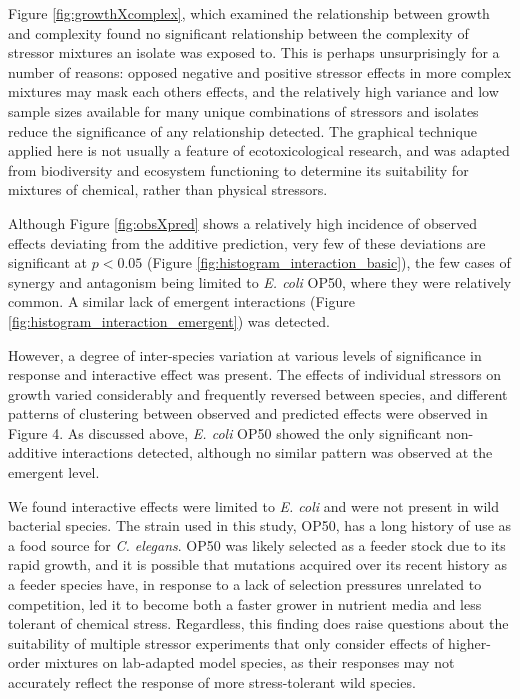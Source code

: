 \documentclass[10pt]{article}
\begin{document}
Figure \ref{fig:growthXcomplex}, which examined the relationship between growth and complexity found no significant relationship between the complexity of stressor mixtures an isolate was exposed to. This is perhaps unsurprisingly for a number of reasons: opposed negative and positive stressor effects in more complex mixtures may mask each others effects, and the relatively high variance and low sample sizes available for many unique combinations of stressors and isolates reduce the significance of any relationship detected. The graphical technique applied here is not usually a feature of ecotoxicological research, and was adapted from biodiversity and ecosystem functioning to determine its suitability for mixtures of chemical, rather than physical stressors.

Although Figure \ref{fig:obsXpred} shows a relatively high incidence of observed effects deviating from the additive prediction, very few of these deviations are significant at $p < 0.05$ (Figure \ref{fig:histogram_interaction_basic}), the few cases of synergy and antagonism being limited to \textit{E. coli} OP50, where they were relatively common. A similar lack of emergent interactions (Figure \ref{fig:histogram_interaction_emergent}) was detected. 

However, a degree of inter-species variation at various levels of significance in response and interactive effect was present. The effects of individual stressors on growth varied considerably and frequently reversed between species, and different patterns of clustering between observed and predicted effects were observed in Figure 4. As discussed above, \textit{E. coli} OP50 showed the only significant non-additive interactions detected, although no similar pattern was observed at the emergent level. 

We found interactive effects were limited to \textit{E. coli} and were not present in wild bacterial species. The strain used in this study, OP50, has a long history of use as a food source for \textit{C. elegans}. OP50 was likely selected as a feeder stock due to its rapid growth, and it is possible that mutations acquired over its recent history as a feeder species \cite{Tenaillon2016} have, in response to a lack of selection pressures unrelated to competition, led it to become both a faster grower in nutrient media and less tolerant of chemical stress. Regardless, this finding does raise questions about the suitability of multiple stressor experiments that only consider effects of higher-order mixtures on lab-adapted model species, as their responses may not accurately reflect the response of more stress-tolerant wild species.
\end{document}
